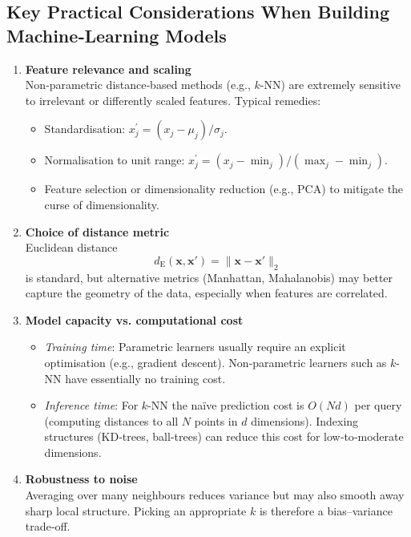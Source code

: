 \documentclass[12pt, a4paper]{article}
\begin{document}
\subsection{Key Practical Considerations When Building Machine‑Learning Models}
\label{sec:practical-considerations}

\begin{enumerate}
\item \textbf{Feature relevance and scaling}\\
    Non‑parametric distance‑based methods (e.g., \(k\)-NN) are extremely sensitive to irrelevant or differently scaled features.  Typical remedies:
    \begin{itemize}
        \item Standardisation: \(x^{\prime}_{j} = (x_{j} - \mu_{j})/\sigma_{j}\).
        \item Normalisation to unit range: \(x^{\prime}_{j}= (x_j-\min_j)/(\max_j-\min_j)\).
        \item Feature selection or dimensionality reduction (e.g., PCA) to mitigate the curse of dimensionality.
    \end{itemize}
\item \textbf{Choice of distance metric}\\
    Euclidean distance  
    \[
    d_{\text{E}}(\mathbf{x},\mathbf{x}')=\big\|\mathbf{x}-\mathbf{x}'\big\|_2
    \]
    is standard, but alternative metrics (Manhattan, Mahalanobis) may better capture the geometry of the data, especially when features are correlated.

\item \textbf{Model capacity vs. computational cost}\\
    \begin{itemize}
        \item \emph{Training time}: Parametric learners usually require an explicit optimisation (e.g., gradient descent).  Non‑parametric learners such as \(k\)-NN have essentially no training cost.
        \item \emph{Inference time}: For \(k\)-NN the naïve prediction cost is \(O(Nd)\) per query (computing distances to all \(N\) points in \(d\) dimensions).  Indexing structures (KD‑trees, ball‑trees) can reduce this cost for low‑to‑moderate dimensions.
    \end{itemize}
\item \textbf{Robustness to noise}\\
    Averaging over many neighbours reduces variance but may also smooth away sharp local structure.  Picking an appropriate \(k\) is therefore a bias–variance trade‑off.


\end{enumerate}
\end{document}
